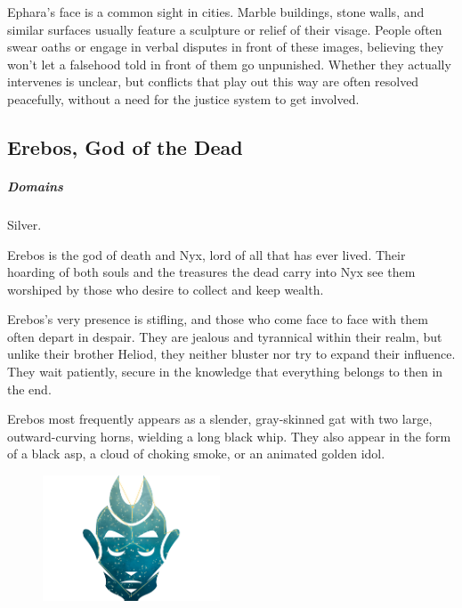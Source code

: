         Ephara's face is a common sight in cities.
        Marble buildings, stone walls, and similar surfaces usually feature a sculpture or relief of their visage.
        People often swear oaths or engage in verbal disputes in front of these images, believing they won't let a falsehood told in front of them go unpunished.
        Whether they actually intervenes is unclear, but conflicts that play out this way are often resolved peacefully, without a need for the justice system to get involved.

\pagebreak

\subsection*{Erebos, God of the Dead} \label{ssec::erebos}
    \subparagraph{Domains} Silver.

    Erebos is the god of death and Nyx, lord of all that has ever lived.
    Their hoarding of both souls and the treasures the dead carry into Nyx see them worshiped by those who desire to collect and keep wealth.

    Erebos's very presence is stifling, and those who come face to face with them often depart in despair.
    They are jealous and tyrannical within their realm, but unlike their brother Heliod, they neither bluster nor try to expand their influence.
    They wait patiently, secure in the knowledge that everything belongs to then in the end.

    Erebos most frequently appears as a slender, gray-skinned gat with two large, outward-curving horns, wielding a long black whip.
    They also appear in the form of a black asp, a cloud of choking smoke, or an animated golden idol.

    \begin{figure}[b]
        \centering
        \includegraphics[width=0.47\textwidth]{02viphoger/img/10s_erebos.png}
    \end{figure}

